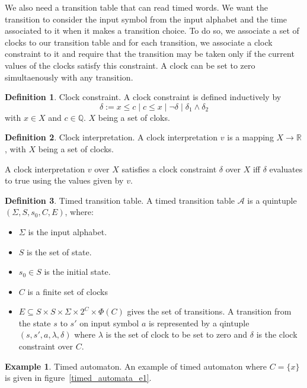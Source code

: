 \documentclass[12pt]{article}
\theoremstyle{definition}
\newtheorem{definition}{Definition}[section]
\theoremstyle{definition}
\newtheorem{example}{Example}[section]
\newcommand{\R}{\mathbb{R}}
\newcommand{\Q}{\mathbb{Q}}
\newcommand{\A}{\mathcal{A}}
\begin{document}
We also need a transition table that can read timed words. We want the transition to consider the input symbol from the input alphabet and the time associated to it when it makes a transition choice. To do so, we associate a set of clocks to our transition table and for each transition, we associate a clock constraint to it and require that the transition may be taken only if the current values of the clocks satisfy this constraint. A clock can be set to zero simultaenously with any transition.

\theoremstyle{definition}
\begin{definition}{Clock constraint.} A clock constraint is defined inductively by
$$\delta := x \le c \mid c \le x \mid \neg \delta \mid \delta_1 \land \delta_2$$ with $x \in X$ and $c \in \Q$. $X$ being a set of cloks.
\end{definition}

\theoremstyle{definition}
\begin{definition}{Clock interpretation.} A clock interpretation $v$ is a mapping $X \to \R$, with $X$ being a set of clocks.
\end{definition}

A clock interpretation $v$ over $X$ satisfies a clock constraint $\delta$ over $X$ iff $\delta$ evaluates to true using the values given by $v$.

\theoremstyle{definition}
\begin{definition}{Timed transition table.} A timed transition table $\A$ is a quintuple $(\Sigma, S, s_{0},C, E)$, where:
\begin{itemize}
\item $\Sigma$ is the input alphabet.
\item $S$ is the set of state.
\item $s_{0} \in S$ is the initial state.
\item $C$ is a finite set of clocks
\item $E \subseteq S \times S \times \Sigma \times 2^{C} \times \Phi(C)$ gives the set of transitions. A transition from the state $s$ to $s'$ on input symbol $a$ is represented by a qintuple $(s, s', a, \lambda, \delta)$ where $\lambda$ is the set of clock to be set to zero and $\delta$ is the clock constraint over $C$.
\end{itemize}
\end{definition}

\theoremstyle{definition}
\begin{example}{Timed automaton.} An example of timed automaton where $C = \{x\}$ is given in figure~\ref{timed_automata_e1}.
\end{example}
\end{document}
